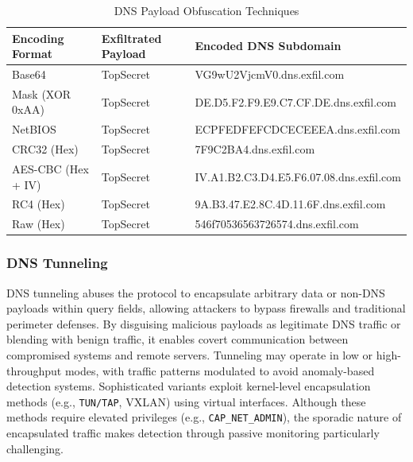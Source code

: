 \documentclass [11pt, proquest] {uwthesis}[2020/02/24]
\begin{document}
\begin{table}[H]
\centering
\begin{tabular}{|l|l|l|}
\hline
\textbf{Encoding Format} & \textbf{Exfiltrated Payload} & \textbf{Encoded DNS Subdomain} \\
\hline
Base64 & TopSecret & VG9wU2VjcmV0.dns.exfil.com \\
\hline
Mask (XOR 0xAA) & TopSecret & DE.D5.F2.F9.E9.C7.CF.DE.dns.exfil.com \\
\hline
NetBIOS & TopSecret & ECPFEDFEFCDCECEEEA.dns.exfil.com \\
\hline
CRC32 (Hex) & TopSecret & 7F9C2BA4.dns.exfil.com \\
\hline
AES-CBC (Hex + IV) & TopSecret & IV.A1.B2.C3.D4.E5.F6.07.08.dns.exfil.com \\
\hline
RC4 (Hex) & TopSecret & 9A.B3.47.E2.8C.4D.11.6F.dns.exfil.com
\\
\hline
Raw (Hex) & TopSecret & 546f70536563726574.dns.exfil.com
\\
\hline
\end{tabular}
\caption{DNS Payload Obfuscation Techniques}
\label{dns_payload_obfuscation}
\end{table}

\subsubsection{DNS Tunneling}
DNS tunneling abuses the protocol to encapsulate arbitrary data or non-DNS payloads within
query fields, allowing attackers to bypass firewalls and traditional perimeter defenses. By
disguising malicious payloads as legitimate DNS traffic or blending with benign traffic, it enables covert communication between compromised systems and remote servers.
Tunneling may operate in low or high-throughput modes, with traffic patterns modulated to
avoid anomaly-based detection systems. Sophisticated variants exploit kernel-level encapsulation methods (e.g., \texttt{TUN/TAP}, VXLAN) using virtual interfaces. Although these methods
require elevated privileges (e.g., \texttt{CAP\_NET\_ADMIN}), the sporadic nature of encapsulated traffic
makes detection through passive monitoring particularly challenging.
\end{document}
